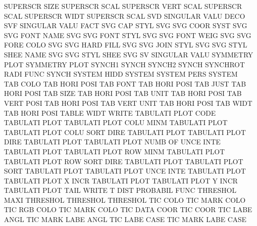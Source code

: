 SUPERSCR SIZE                           SUPERSCR SCAL
SUPERSCR VERT SCAL                      SUPERSCR SCAL
SUPERSCR WIDT                           SUPERSCR SCAL
SVD                                     SINGULAR VALU DECO
SVF                                     SINGULAR VALU FACT
SVG      CAP  STYL                      SVG
SVG      COOR SYST                      SVG
SVG      FONT NAME                      SVG
SVG      FONT STYL                      SVG
SVG      FONT WEIG                      SVG
SVG      FORE COLO                      SVG
SVG      HARD FILL                      SVG
SVG      JOIN STYL                      SVG
SVG      STYL SHEE NAME                 SVG
SVG      STYL SHEE                      SVG
SV                                      SINGULAR VALU
SYMMETRY PLOT                           SYMMETRY PLOT
SYNCH1                                  SYNCH
SYNCH2                                  SYNCH
SYNCHROT RADI FUNC                      SYNCH
SYSTEM   HIDD                           SYSTEM
SYSTEM   PERS                           SYSTEM
TAB      COLO                           TAB HORI POSI
TAB      FONT                           TAB HORI POSI
TAB      JUST                           TAB HORI POSI
TAB      SIZE                           TAB HORI POSI
TAB      UNIT                           TAB HORI POSI
TAB      VERT POSI                      TAB HORI POSI
TAB      VERT UNIT                      TAB HORI POSI
TAB      WIDT                           TAB HORI POSI
TABLE    WIDT                           WRITE
TABULATI PLOT CODE                      TABULATI PLOT
TABULATI PLOT COLU MINM                 TABULATI PLOT
TABULATI PLOT COLU SORT DIRE            TABULATI PLOT
TABULATI PLOT DIRE                      TABULATI PLOT
TABULATI PLOT NUMB OF   UNCE INTE       TABULATI PLOT
TABULATI PLOT ROW  MINM                 TABULATI PLOT
TABULATI PLOT ROW  SORT DIRE            TABULATI PLOT
TABULATI PLOT SORT                      TABULATI PLOT
TABULATI PLOT UNCE INTE                 TABULATI PLOT
TABULATI PLOT X    INCR                 TABULATI PLOT
TABULATI PLOT Y    INCR                 TABULATI PLOT
TAIL                                    WRITE
T        DIST                           PROBABIL FUNC
THRESHOL MAXI                           THRESHOL
THRESHOL                                THRESHOL
TIC      COLO                           TIC      MARK COLO
TIC      RGB  COLO                      TIC      MARK COLO
TIC      DATA COOR                      TIC      COOR
TIC      LABE ANGL                      TIC      MARK LABE ANGL
TIC      LABE CASE                      TIC      MARK LABE CASE
